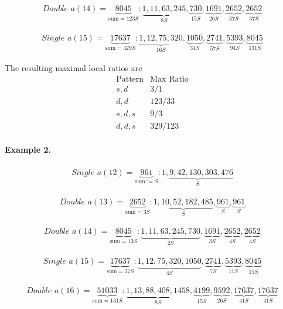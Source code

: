 \documentclass[12pt, oneside]{article}
\numberwithin{equation}{section}
\theoremstyle{definition}
\theoremstyle{plain}
\theoremstyle{remark}
\begin{document}
\[
\begin{array}{l}
\textit{Double } a(14) = \underbrace{8045}_{\text{sum} = 123S}:
\underbrace{1,11,63,245}_{8S},
\underbrace{730}_{15S},
\underbrace{1691}_{26S},
\underbrace{2652}_{37S},
\underbrace{2652}_{37S}
\end{array}
\]

\[
\begin{array}{l}
\textit{Single } a(15) = \underbrace{17637}_{\text{sum} = 329S}:
\underbrace{1,12,75,320}_{16S},
\underbrace{1050}_{31S},
\underbrace{2741}_{57S},
\underbrace{5393}_{94S},
\underbrace{8045}_{131S}
\end{array}
\]

The resulting maximal local ratios are
\[
\begin{array}{c|c}
\text{Pattern} & \text{Max Ratio} \\
\hline
s,d & 3/1 \\
d,d & 123/33 \\
s,d,s & 9/3 \\
d,d,s & 329/123
\end{array}
\]

\paragraph{Example 2.}
\[
\begin{array}{l}
\textit{Single } a(12) = \underbrace{961}_{\text{sum} := S}:
\underbrace{1,9,42,130,303,476}_{S}
\end{array}
\]

\[
\begin{array}{l}
\textit{Double } a(13) = \underbrace{2652}_{\text{sum} = 3S}:
\underbrace{1,10,52,182,485}_{S},
\underbrace{961}_{S},
\underbrace{961}_{S}
\end{array}
\]

\[
\begin{array}{l}
\textit{Double } a(14) = \underbrace{8045}_{\text{sum} = 13S}:
\underbrace{1,11,63,245,730}_{2S},
\underbrace{1691}_{3S},
\underbrace{2652}_{4S},
\underbrace{2652}_{4S}
\end{array}
\]

\[
\begin{array}{l}
\textit{Single } a(15) = \underbrace{17637}_{\text{sum} = 37S}:
\underbrace{1,12,75,320,1050}_{4S},
\underbrace{2741}_{7S},
\underbrace{5393}_{11S},
\underbrace{8045}_{15S}
\end{array}
\]

\[
\begin{array}{l}
\textit{Double } a(16) = \underbrace{51033}_{\text{sum} = 131S}:
\underbrace{1,13,88,408,1458}_{8S},
\underbrace{4199}_{15S},
\underbrace{9592}_{26S},
\underbrace{17637}_{41S},
\underbrace{17637}_{41S}
\end{array}
\]
\end{document}
